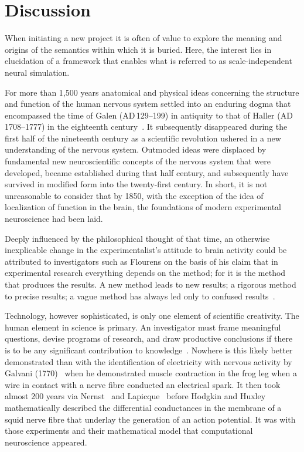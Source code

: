 \documentclass{article}
\begin{document}
\section{Discussion}

When initiating a new project it is often of value to explore the meaning and origins of the semantics within which it is buried. Here, the interest lies in elucidation of a framework that enables what is referred to as scale-independent neural simulation.

For more than 1,500 years anatomical and physical ideas concerning the structure and function of the human nervous system settled into an enduring dogma that encompassed the time of Galen (\small{AD}\,129--199) in antiquity to that of Haller (\small{AD}\,1708--1777) in the eighteenth century~\cite{clarke87}. It subsequently disappeared during the first half of the nineteenth century as a scientific revolution ushered in a new understanding of the nervous system. Outmoded ideas were displaced by fundamental new neuroscientific concepts of the nervous system that were developed, became established during that half century, and subsequently have survived in modified form into the twenty-first century. In short, it is not unreasonable to consider that by 1850, with the exception of the idea of localization of function in the brain, the foundations of modern experimental neuroscience had been laid.

Deeply influenced by the philosophical thought of that time, an otherwise inexplicable change in the experimentalist's attitude to brain activity could be attributed to investigators such as Flourens on the basis of his claim that in experimental research everything depends on the method; for it is the method that produces the results. A new method leads to new results; a rigorous method to precise results; a vague method has always led only to confused results~\cite{flourens24}.

Technology, however sophisticated, is only one element of scientific creativity. The human element in science is primary. An investigator must frame meaningful questions, devise programs of research, and draw productive conclusions if there is to be any significant contribution to knowledge~\cite{clarke87}. Nowhere is this likely better demonstrated than with the identification of electricity with nervous activity by Galvani (1770)~\cite{galvani91} when he demonstrated muscle contraction in the frog leg when a wire in contact with a nerve fibre conducted an electrical spark. It then took almost 200 years via Nernst~\cite{something} and Lapicque~\cite{something} before Hodgkin and Huxley~\cite{hodgkin52e} mathematically described the differential conductances in the membrane of a squid nerve fibre that underlay the generation of an action potential. It was with those experiments and their mathematical model that computational neuroscience appeared.
\end{document}
